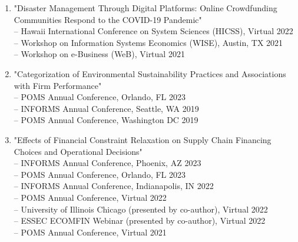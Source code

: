 \documentclass[margin,line]{resume}
\begin{document}
\begin{resume}
\begin{enumerate}[topsep=0pt, leftmargin=*]
 	     \item "Disaster Management Through Digital Platforms: Online Crowdfunding Communities Respond to the COVID-19 Pandemic"\\[0.3em]
             -- Hawaii International Conference on System Sciences (HICSS), Virtual \hfill 2022\\
 	           -- Workshop on Information Systems Economics (WISE), Austin, TX \hfill 2021\\
 	           -- Workshop on e-Business (WeB), Virtual \hfill 2021\\
              
 	     \item "Categorization of Environmental Sustainability Practices and Associations with Firm Performance"\\[0.3em]
  	     -- POMS Annual Conference, Orlando, FL \hfill   2023\\
 	           -- INFORMS Annual Conference, Seattle, WA \hfill2019\\
 	           -- POMS Annual Conference, Washington DC \hfill2019
\\
  	     \item "Effects of Financial Constraint Relaxation on Supply Chain Financing Choices and Operational Decisions"\\[0.3em]
  	    -- INFORMS Annual Conference, Phoenix, AZ \hfill 2023\\ 
        -- POMS Annual Conference, Orlando, FL \hfill   2023\\
  	     -- INFORMS Annual Conference, Indianapolis, IN \hfill  2022\\
  	     -- POMS Annual Conference, Virtual \hfill2022\\
  	     -- University of Illinois Chicago (presented by co-author), Virtual \hfill 2022\\
 	           -- ESSEC ECOMFIN Webinar (presented by co-author), Virtual \hfill 2022\\
 	           -- POMS Annual Conference, Virtual \hfill2021
 	           

 	  \end{enumerate}


\end{resume}
\end{document}

